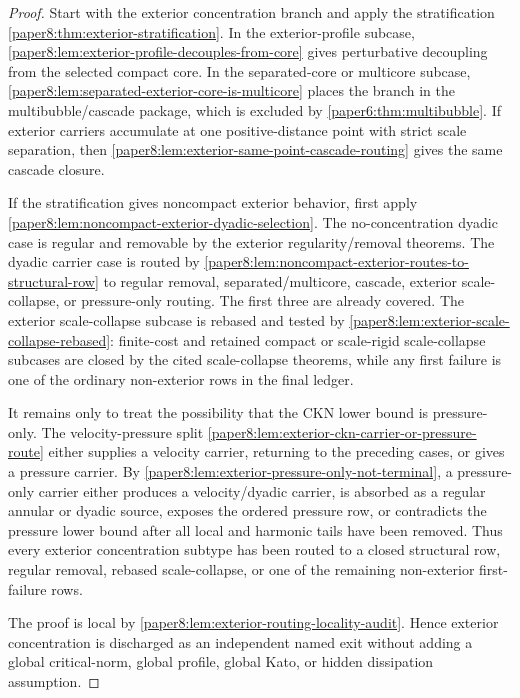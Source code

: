 \documentclass[11pt]{amsart}
\theoremstyle{plain}
\theoremstyle{definition}
\theoremstyle{remark}
\begin{document}
\begin{proof}
Start with the exterior concentration branch and apply the stratification
\cref{paper8:thm:exterior-stratification}.  In the exterior-profile subcase,
\cref{paper8:lem:exterior-profile-decouples-from-core} gives perturbative
decoupling from the selected compact core.  In the separated-core or multicore
subcase, \cref{paper8:lem:separated-exterior-core-is-multicore} places the
branch in the multibubble/cascade package, which is excluded by
\cref{paper6:thm:multibubble}.  If exterior carriers accumulate at one
positive-distance point with strict scale separation, then
\cref{paper8:lem:exterior-same-point-cascade-routing} gives the same cascade
closure.
\par
If the stratification gives noncompact exterior behavior, first apply
\cref{paper8:lem:noncompact-exterior-dyadic-selection}.  The no-concentration
dyadic case is regular and removable by the exterior regularity/removal
theorems.  The dyadic carrier case is routed by
\cref{paper8:lem:noncompact-exterior-routes-to-structural-row} to regular
removal, separated/multicore, cascade, exterior scale-collapse, or
pressure-only routing.  The first three are already covered.  The exterior
scale-collapse subcase is rebased and tested by
\cref{paper8:lem:exterior-scale-collapse-rebased}: finite-cost and retained
compact or scale-rigid scale-collapse subcases are closed by the cited
scale-collapse theorems, while any first failure is one of the ordinary
non-exterior rows in the final ledger.
\par
It remains only to treat the possibility that the CKN lower bound is
pressure-only.  The velocity-pressure split
\cref{paper8:lem:exterior-ckn-carrier-or-pressure-route} either supplies a
velocity carrier, returning to the preceding cases, or gives a pressure
carrier.  By \cref{paper8:lem:exterior-pressure-only-not-terminal}, a
pressure-only carrier either produces a velocity/dyadic carrier, is absorbed
as a regular annular or dyadic source, exposes the ordered pressure row, or
contradicts the pressure lower bound after all local and harmonic tails have
been removed.
Thus every exterior concentration subtype has been routed to a closed
structural row, regular removal, rebased scale-collapse, or one of the
remaining non-exterior first-failure rows.
\par
The proof is local by
\cref{paper8:lem:exterior-routing-locality-audit}.  Hence exterior
concentration is discharged as an independent named exit without adding a
global critical-norm, global profile, global Kato, or hidden dissipation
assumption.
\end{proof}
\end{document}

